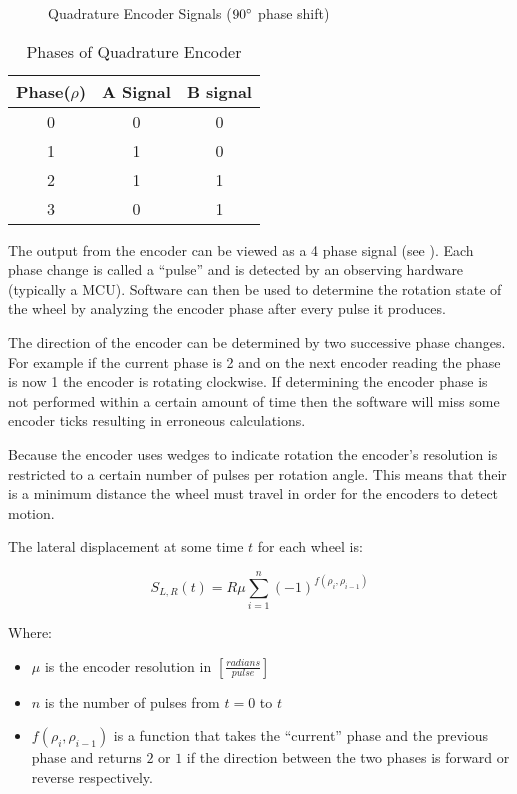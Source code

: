 \documentclass[main.tex]{subfiles}
\begin{document}
\begin{figure}[h]
	\begin{center}
	
	\end{center}
	\caption{Quadrature Encoder Signals ($90^\circ$ phase shift)}
	\label{fig:encSig}
\end{figure}

\begin{table}[h]
	\begin{center}
	\begin{tabularx}{.35\textwidth}{ccc}
		\toprule
		Phase($\rho$) & A Signal & B signal\\
		\midrule
		0 & 0 & 0 \\
		1 & 1 & 0 \\
		2 & 1 & 1 \\
		3 & 0 & 1 \\
		\bottomrule
		\end{tabularx}
		\caption{Phases of Quadrature Encoder}
		\label{tab:phaseTab}
	\end{center}
\end{table}

The output from the encoder can be viewed as a 4 phase signal (see
). Each phase change is called a ``pulse'' and is detected by
an observing hardware (typically a MCU). Software can then be used to determine
the rotation state of the wheel by analyzing the encoder phase after every pulse
it produces.

The direction of the encoder can be determined by two successive phase changes.
For example if the current phase is 2 and on the next encoder reading the phase
is now 1 the encoder is rotating clockwise. If determining the encoder phase is
not performed within a certain amount of time then the software will miss some
encoder ticks resulting in erroneous calculations. 

Because the encoder uses wedges to indicate rotation the encoder's resolution is
restricted to a certain number of pulses per rotation angle. This means that
their is a minimum distance the wheel must travel in order for the encoders to
detect motion.

The lateral displacement at some time $t$ for each wheel is: 

\begin{equation}
\label{eq:encTransDist}
S_{L,R}(t) = R\mu\sum_{i=1}^n{(-1)^{f(\rho_i,\rho_{i-1})}}
\end{equation}

Where: 
\begin{itemize}
\item $\mu$ is the encoder resolution in $[\frac{radians}{pulse}]$
\item $n$ is the number of pulses from $t=0$ to $t$
\item $f(\rho_i,\rho_{i-1})$ is a function that takes the ``current'' phase and
the previous phase and returns $2$ or $1$ if the direction between the two
phases is forward or reverse respectively.
\end{itemize}
\end{document}
